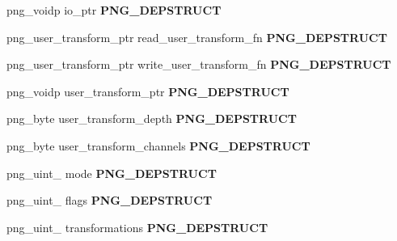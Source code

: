 \begin{DoxyCompactItemize}
\item 
png\+\_\+voidp io\+\_\+ptr {\bfseries P\+N\+G\+\_\+\+D\+E\+P\+S\+T\+R\+U\+CT}\hypertarget{structpng__struct__def_af7e9a211e6f65819fd57ba524b64dbda}{}\label{structpng__struct__def_af7e9a211e6f65819fd57ba524b64dbda}

\item 
png\+\_\+user\+\_\+transform\+\_\+ptr read\+\_\+user\+\_\+transform\+\_\+fn {\bfseries P\+N\+G\+\_\+\+D\+E\+P\+S\+T\+R\+U\+CT}\hypertarget{structpng__struct__def_ad0b52f9be2ef43aadc117eb95031f795}{}\label{structpng__struct__def_ad0b52f9be2ef43aadc117eb95031f795}

\item 
png\+\_\+user\+\_\+transform\+\_\+ptr write\+\_\+user\+\_\+transform\+\_\+fn {\bfseries P\+N\+G\+\_\+\+D\+E\+P\+S\+T\+R\+U\+CT}\hypertarget{structpng__struct__def_a1bd0208cd2a13c2a2e4e757e0796bd69}{}\label{structpng__struct__def_a1bd0208cd2a13c2a2e4e757e0796bd69}

\item 
png\+\_\+voidp user\+\_\+transform\+\_\+ptr {\bfseries P\+N\+G\+\_\+\+D\+E\+P\+S\+T\+R\+U\+CT}\hypertarget{structpng__struct__def_a5b13f553c9500461d7e005087cf5c8e0}{}\label{structpng__struct__def_a5b13f553c9500461d7e005087cf5c8e0}

\item 
png\+\_\+byte user\+\_\+transform\+\_\+depth {\bfseries P\+N\+G\+\_\+\+D\+E\+P\+S\+T\+R\+U\+CT}\hypertarget{structpng__struct__def_a8aa43b565f81be7201b0d0713b021b4b}{}\label{structpng__struct__def_a8aa43b565f81be7201b0d0713b021b4b}

\item 
png\+\_\+byte user\+\_\+transform\+\_\+channels {\bfseries P\+N\+G\+\_\+\+D\+E\+P\+S\+T\+R\+U\+CT}\hypertarget{structpng__struct__def_a587de62e86963bd3850197ea93ae9b9e}{}\label{structpng__struct__def_a587de62e86963bd3850197ea93ae9b9e}

\item 
png\+\_\+uint\+\_ mode {\bfseries P\+N\+G\+\_\+\+D\+E\+P\+S\+T\+R\+U\+CT}\hypertarget{structpng__struct__def_a5afb69cc7bc6529a6b597cde55bb344b}{}\label{structpng__struct__def_a5afb69cc7bc6529a6b597cde55bb344b}

\item 
png\+\_\+uint\+\_ flags {\bfseries P\+N\+G\+\_\+\+D\+E\+P\+S\+T\+R\+U\+CT}\hypertarget{structpng__struct__def_a3d6f05cd70d6fd1a5979cc853ac4d3a9}{}\label{structpng__struct__def_a3d6f05cd70d6fd1a5979cc853ac4d3a9}

\item 
png\+\_\+uint\+\_ transformations {\bfseries P\+N\+G\+\_\+\+D\+E\+P\+S\+T\+R\+U\+CT}\hypertarget{structpng__struct__def_a687761b8330757466fd58552ab48e428}{}\label{structpng__struct__def_a687761b8330757466fd58552ab48e428}


\end{DoxyCompactItemize}
